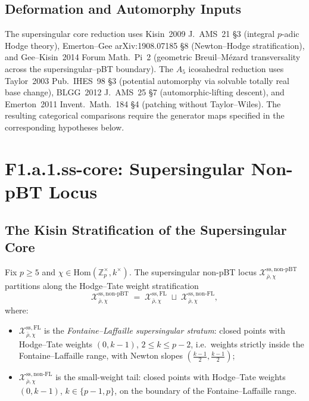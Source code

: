 \subsection{Deformation and Automorphy Inputs}
\label{v4-arith:w10-f:comparison}

The supersingular core reduction uses Kisin~2009 J.~AMS~21 \S 3
(integral \(p\)-adic Hodge theory), Emerton--Gee arXiv:1908.07185 \S 8
(Newton--Hodge stratification), and Gee--Kisin~2014 Forum Math.~Pi~2
(geometric Breuil--M{\'e}zard transversality across the
supersingular--pBT boundary).
The \(A_{5}\) icosahedral reduction uses Taylor~2003 Pub.~IHES~98 \S 3
(potential automorphy via solvable totally real base change),
BLGG~2012 J.~AMS~25 \S 7 (automorphic-lifting descent), and
Emerton~2011 Invent.~Math.~184 \S 4 (patching without Taylor--Wiles).
The resulting categorical comparisons require the generator maps
specified in the corresponding hypotheses below.

\section{F1.a.1.ss-core: Supersingular Non-pBT Locus}
\label{v4-arith:w10-f:ss-core}

\subsection{The Kisin Stratification of the Supersingular Core}
\label{v4-arith:w10-f:ss-stratification}

\begin{definition}
\label{v4-arith:w10-f:def:ss-strata}
Fix \(p\geq 5\) and
\(\chi\in\mathrm{Hom}(\mathbb{Z}_{p}^{\times},k^{\times})\). The
supersingular non-pBT locus
\(\mathcal{X}^{\mathrm{ss,non\text{-}pBT}}_{\bar\rho,\chi}\) partitions
along the Hodge--Tate weight stratification
\[
\mathcal{X}^{\mathrm{ss,non\text{-}pBT}}_{\bar\rho,\chi}
\;=\;\mathcal{X}^{\mathrm{ss,FL}}_{\bar\rho,\chi}\;\sqcup\;
\mathcal{X}^{\mathrm{ss,non\text{-}FL}}_{\bar\rho,\chi},
\]
where:
\begin{itemize}
\item \(\mathcal{X}^{\mathrm{ss,FL}}_{\bar\rho,\chi}\) is the
\emph{Fontaine--Laffaille supersingular stratum}: closed points with
Hodge--Tate weights \((0,k-1)\), \(2\leq k\leq p-2\), i.e.\ weights
strictly inside the Fontaine--Laffaille range, with Newton slopes
\((\tfrac{k-1}{2},\tfrac{k-1}{2})\);
\item \(\mathcal{X}^{\mathrm{ss,non\text{-}FL}}_{\bar\rho,\chi}\) is the
small-weight tail: closed points with Hodge--Tate weights \((0,k-1)\),
\(k\in\{p-1,p\}\), on the boundary of the Fontaine--Laffaille range.
\end{itemize}
\end{definition}

